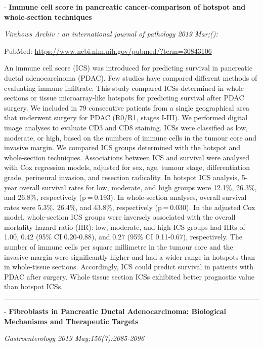 \documentclass[]{article}
\begin{document}
 - \textbf{Immune cell score in pancreatic cancer-comparison of hotspot
and whole-section techniques}

\emph{Virchows Archiv : an international journal of pathology 2019
Mar;():}

PubMed: \url{https://www.ncbi.nlm.nih.gov/pubmed/?term=30843106}

An immune cell score (ICS) was introduced for predicting survival in
pancreatic ductal adenocarcinoma (PDAC). Few studies have compared
different methods of evaluating immune infiltrate. This study compared
ICSs determined in whole sections or tissue microarray-like hotspots for
predicting survival after PDAC surgery. We included in 79 consecutive
patients from a single geographical area that underwent surgery for PDAC
(R0/R1, stages I-III). We performed digital image analyses to evaluate
CD3 and CD8 staining. ICSs were classified as low, moderate, or high,
based on the numbers of immune cells in the tumour core and invasive
margin. We compared ICS groups determined with the hotspot and
whole-section techniques. Associations between ICS and survival were
analysed with Cox regression models, adjusted for sex, age, tumour
stage, differentiation grade, perineural invasion, and resection
radicality. In hotspot ICS analysis, 5-year overall survival rates for
low, moderate, and high groups were 12.1\%, 26.3\%, and 26.8\%,
respectively (p = 0.193). In whole-section analyses, overall survival
rates were 5.3\%, 26.4\%, and 43.8\%, respectively (p = 0.030). In the
adjusted Cox model, whole-section ICS groups were inversely associated
with the overall mortality hazard ratio (HR): low, moderate, and high
ICS groups had HRs of 1.00, 0.42 (95\% CI 0.20-0.88), and 0.27 (95\% CI
0.11-0.67), respectively. The number of immune cells per square
millimetre in the tumour core and the invasive margin were significantly
higher and had a wider range in hotspots than in whole-tissue sections.
Accordingly, ICS could predict survival in patients with PDAC after
surgery. Whole tissue section ICSs exhibited better prognostic value
than hotspot ICSs.

{}

{}

\begin{center}\rule{0.5\linewidth}{\linethickness}\end{center}

 - \textbf{Fibroblasts in Pancreatic Ductal Adenocarcinoma: Biological
Mechanisms and Therapeutic Targets}

\emph{Gastroenterology 2019 May;156(7):2085-2096}
\end{document}

